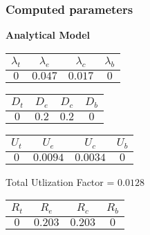 \documentclass{article}
\begin{document}
\subsubsection{Computed parameters}
\begin{minipage}{0.5\textwidth}
\centering	\textbf{Analytical Model}
\begin{table}[H]
\centering
\begin{tabular}{@{}cccc@{}}
\toprule
$\lambda_t$ & $\lambda_e$ & $\lambda_c$ & $\lambda_b$\\
\midrule
$0$ & $0.047$ & $0.017$ & $0$\\
\bottomrule
\end{tabular}
\end{table}\begin{table}[H]
\centering
\begin{tabular}{@{}cccc@{}}
\toprule
$D_t$ & $D_e$ & $D_c$ & $D_b$\\
\midrule
$0$ & $0.2$ & $0.2$ & $0$\\
\bottomrule
\end{tabular}
\end{table}\begin{table}[H]
\centering
\begin{tabular}{@{}cccc@{}}
\toprule
$U_t$ & $U_e$ & $U_c$ & $U_b$\\
\midrule
$0$ & $0.0094$ & $0.0034$ & $0$\\
\bottomrule
\end{tabular}
\end{table}
\centering Total Utlization Factor = $0.0128$
\begin{table}[H]
\centering
\begin{tabular}{@{}cccc@{}}
\toprule
$R_t$ & $R_e$ & $R_c$ & $R_b$\\
\midrule
$0$ & $0.203$ & $0.203$ & $0$\\
\bottomrule
\end{tabular}
\end{table}
\end{minipage}
\end{document}

